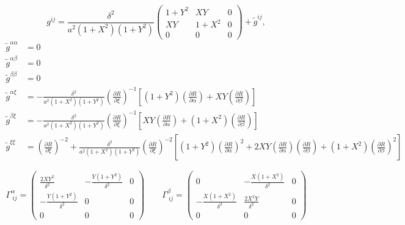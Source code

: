 \documentclass{article}
\newcommand{\pdiff}[2]{\frac{\partial #1}{\partial #2}}
\begin{document}
\begin{equation}
g^{ij} = \frac{\delta^2}{a^2 (1+X^2) (1+Y^2)} \left( \begin{array}{ccc} 1+Y^2 & X Y & 0 \\[2.0ex] X Y & 1+X^2 & 0 \\[2.0ex] 0 & 0 & 0 \end{array} \right) + \tilde{g}^{ij},
\end{equation}
\begin{align}
\tilde{g}^{\alpha \alpha} &= 0 \\
\tilde{g}^{\alpha \beta} &= 0 \\
\tilde{g}^{\beta \beta} &= 0 \\
\tilde{g}^{\alpha \xi} &= - \frac{\delta^2}{a^2 (1+X^2) (1+Y^2)} \left( \pdiff{R}{\xi} \right)^{-1} \left[ (1+Y^2) \left( \pdiff{R}{\alpha} \right) + X Y \left( \pdiff{R}{\beta} \right) \right] \\
\tilde{g}^{\beta \xi} &= - \frac{\delta^2}{a^2 (1+X^2) (1+Y^2)} \left( \pdiff{R}{\xi} \right)^{-1} \left[ X Y \left( \pdiff{R}{\alpha} \right) + (1+X^2) \left( \pdiff{R}{\beta} \right) \right] \\
\tilde{g}^{\xi \xi} &= \left( \pdiff{R}{\xi} \right)^{-2} + \frac{\delta^2}{a^2 (1+X^2) (1+Y^2)} \left( \pdiff{R}{\xi} \right)^{-2} \left[ (1+Y^2) \left( \pdiff{R}{\alpha} \right)^2 + 2 X Y \left( \pdiff{R}{\alpha} \right) \left( \pdiff{R}{\beta} \right) + (1+X^2) \left( \pdiff{R}{\beta} \right)^2 \right]
\end{align}

\begin{equation}
\Gamma^{\alpha}_{\ i j} = \left( \begin{array}{ccc} \displaystyle \frac{2 X Y^2}{\delta^2} & \displaystyle - \frac{Y (1+Y^2)}{\delta^2} & 0 \\[2.0ex] \displaystyle - \frac{Y (1+Y^2)}{\delta^2} & 0 & 0 \\[2.0ex] 0 & 0 & 0 \end{array} \right) \qquad \Gamma^{\beta}_{\ i j} = \left( \begin{array}{ccc} \displaystyle 0 & \displaystyle - \frac{X (1+X^2)}{\delta^2} & 0 \\[2.0ex] \displaystyle - \frac{X (1+X^2)}{\delta^2} & \displaystyle \frac{2 X^2 Y}{\delta^2} & 0 \\[2.0ex] 0 & 0 & 0 \end{array} \right)
\end{equation}
\end{document}
